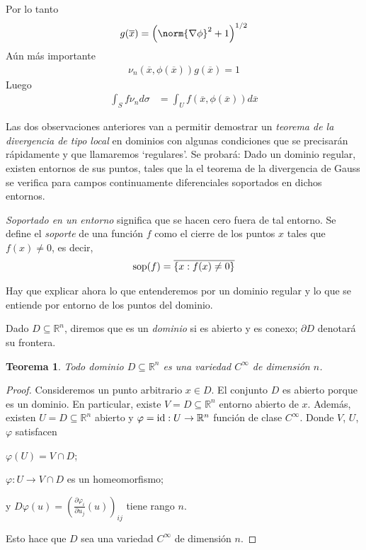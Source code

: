 \documentclass{report}
\newcommand{\realNumbers}{\mathbb{R}}
\newtheorem{theorem}{Teorema}
\theoremstyle{definition}
\theoremstyle{remark}
\DeclareMathOperator{\support}{\textnormal{sop}}
\begin{document}
  Por lo tanto
  \begin{align}
    g(\overline{x})
    =
    \left( \norm{\nabla \phi}^2 + 1 \right)^{1 / 2}
  \end{align}
  Aún más importante
  \begin{align}
    \nu_n(\overline{x}, \phi(\overline{x}))
    g(\overline{x})
    =
    1
  \end{align}
  Luego
  \begin{align}
    \int_S f \nu_n d \sigma
    &=
    \int_U
      f(\overline{x}, \phi(\overline{x}))
    d \overline{x}
  \end{align}

  \newpage
  Las dos observaciones anteriores van a permitir demostrar un \emph{teorema de la divergencia de tipo local} en dominios con algunas condiciones que se precisarán rápidamente y que llamaremos `regulares'.
  Se probará:
  Dado un dominio regular, existen entornos de sus puntos, tales que la el teorema de la divergencia de Gauss se verifica para campos continuamente diferenciales soportados en dichos entornos.

  \emph{Soportado en un entorno} significa que se hacen cero fuera de tal entorno.
  Se define el \emph{soporte} de una función \(f\) como el cierre de los puntos \(x\) tales que \(f(x) \neq 0\), es decir,
  \begin{align}
    \support(f)
    =
    \overline{\{x : f(x) \neq 0\}}
  \end{align}

  Hay que explicar ahora lo que entenderemos por un dominio regular y lo que se entiende por entorno de los puntos del dominio.

  Dado \(D \subseteq \realNumbers^n\), diremos que es un \emph{dominio} si es abierto y es conexo;
  \(\partial D\) denotará su frontera.

  \begin{theorem}
    Todo dominio \(D \subseteq \realNumbers^n\) es una variedad \(C^{\infty}\) de dimensión \(n\).
  \end{theorem}
  \begin{proof}
    Consideremos un punto arbitrario \(x \in D\).
    El conjunto \(D\) es abierto porque es un dominio.
    En particular, existe \(V = D \subseteq \realNumbers^n\) entorno abierto de \(x\).
    \newcommand{\identity}{\textnormal{id}}
    Además, existen \(U = D \subseteq \realNumbers^n\) abierto y \(\varphi = \identity : U \rightarrow \realNumbers^n\) función de clase \(C^{\infty}\).
    Donde \(V\), \(U\), \(\varphi\) satisfacen
    \begin{enumerate*}
      \item \(\varphi(U) = V \cap D\);
      \item \(\varphi : U \rightarrow V \cap D\) es un homeomorfismo;
      \item y \(D \varphi (u) = \left( \frac{\partial \varphi_i}{\partial u_j}(u) \right)_{i j}\) tiene rango \(n\).
    \end{enumerate*}
    Esto hace que \(D\) sea una variedad \(C^{\infty}\) de dimensión \(n\).
  \end{proof}
\end{document}
